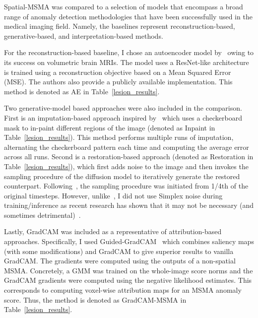 Spatial-MSMA was compared to a selection of models that encompass a broad range of anomaly detection methodologies that have been successfully used in the medical imaging field. Namely, the baselines represent reconstruction-based, generative-based, and interpretation-based methods.

For the reconstruction-based baseline, I chose an autoencoder model by~\cite{aelu2023} owing to its success on volumetric brain MRIs. The model uses a ResNet-like architecture is trained using a reconstruction objective based on a Mean Squared Error (MSE). The authors also provide a publicly available implementation. This method is denoted as AE in Table~\ref{lesion_results}.

Two generative-model based approaches were also included in the comparison. First is an imputation-based approach inspired by~\cite{liuUnsupervisedOutofDistributionDetection2023} which uses a checkerboard mask to in-paint different regions of the image (denoted as Inpaint in Table~\ref{lesion_results}). This method performs multiple runs of imputation, alternating the checkerboard pattern each time and computing the average error across all runs. Second is a restoration-based approach (denoted as Restoration in Table~\ref{lesion_results}), which first adds noise to the image and then invokes the sampling procedure of the diffusion model to iteratively generate the restored counterpart. Following~\cite{wyattAnoddpmAnomalyDetection2022}, the sampling procedure was initiated from 1/4th of the original timesteps. However, unlike~\cite{wyattAnoddpmAnomalyDetection2022}, I did not use Simplex noise during training/inference as recent research has shown that it may not be necessary (and sometimes detrimental)~\cite{kascenas2023}. 

Lastly, GradCAM was included as a representative of attribution-based approaches. Specifically, I used Guided-GradCAM~\cite{Selvaraju2016GradCAMVE} which combines saliency maps (with some modifications) and GradCAM to give superior results to vanilla GradCAM. The gradients were computed using the outputs of a non-spatial MSMA. Concretely, a GMM was trained on the whole-image score norms and the GradCAM gradients were computed using the negative likelihood estimates. This corresponds to computing voxel-wise attribution maps for an MSMA anomaly score. Thus, the method is denoted as GradCAM-MSMA in Table~\ref{lesion_results}.

